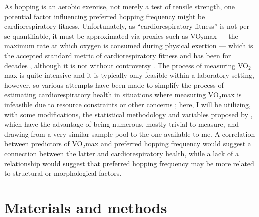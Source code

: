 \documentclass{article}
\begin{document}
As hopping is an aerobic exercise, not merely a test of tensile strength, one potential factor influencing preferred hopping frequency might be cardiorespiratory fitness. Unfortunately, as ``cardiorespiratory fitness'' is not per se quantifiable, it must be approximated via proxies such as VO$_2$max --- the maximum rate at which oxygen is consumed during physical exertion --- which is the accepted standard metric of cardiorespiratory fitness and has been for decades \parencite{hamlin2014,siconolfi1982}, although it is not without controversy \parencite{green2018}. The process of measuring VO$_2$max is quite intensive and it is typically only feasible within a laboratory setting, however, so various attempts have been made to simplify the process of estimating cardiorespiratory health in situations where measuring VO$_2$max is infeasible due to resource constraints or other concerns \parencite{ashfaq2022,george1996,grant1999}; here, I will be utilizing, with some modifications, the statistical methodology and variables proposed by \textcite{abut2016}, which have the advantage of being numerous, mostly trivial to measure, and drawing from a very similar sample pool to the one available to me. A correlation between predictors of VO$_2$max and preferred hopping frequency would suggest a connection between the latter and cardiorespiratory health, while a lack of a relationship would suggest that preferred hopping frequency may be more related to structural or morphological factors. 

\section{Materials and methods}
\end{document}
